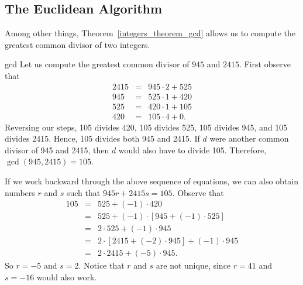  
\subsection*{The Euclidean Algorithm}

Among other things, Theorem~\ref{integers_theorem_gcd} allows us to compute the greatest common divisor of two integers. 

\medskip

\begin{example}{gcd}
Let us compute the greatest common divisor of $945$ and $2415$.  First observe that 
\begin{eqnarray*}
2415 & = & 945 \cdot 2 + 525 \\
945 & = & 525 \cdot 1 + 420 \\
525 & = & 420 \cdot 1 + 105 \\
420 & = & 105 \cdot 4 + 0.
\end{eqnarray*}
Reversing our steps, 105 divides 420, 105 divides 525, 105 divides 945, and 105 divides 2415.  Hence, 105 divides both 945 and 2415.  If $d$ were another common divisor of 945 and 2415, then $d$ would also have to divide 105.  Therefore, $\gcd( 945, 2415 ) = 105$.

If we work backward through the above sequence of equations, we can also obtain numbers $r$ and $s$ such that $945 r + 2415 s = 105$.  Observe that 
\begin{eqnarray*}
105 & = & 525 + (-1) \cdot 420 \\
& = & 525 + (-1) \cdot [945 + (-1) \cdot 525] \\
& = & 2 \cdot 525 + (-1) \cdot 945 \\
& = & 2 \cdot [2415 + (-2) \cdot 945] + (-1) \cdot 945 \\
& = & 2 \cdot 2415 + (-5) \cdot 945.
\end{eqnarray*}
So $r = -5$ and $s= 2$.  Notice that $r$ and $s$ are not unique, since $r = 41$ and $s = -16$ would also work.
\end{example}

